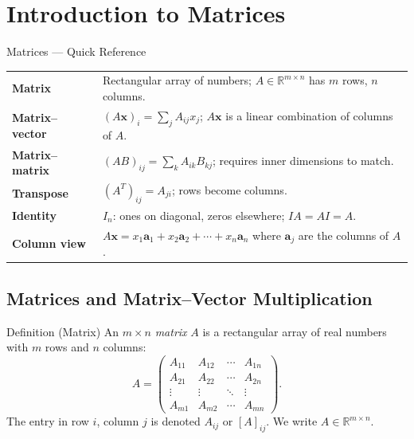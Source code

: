
\section{Introduction to Matrices}

\begin{toolkitbox}{Matrices --- Quick Reference}
\begin{tabular}{@{}p{}p{}@{}}
\textbf{Matrix}            & Rectangular array of numbers; $A \in \mathbb{R}^{m \times n}$ has $m$ rows, $n$ columns. \\[4pt]
\textbf{Matrix--vector}    & $(A\mathbf{x})_i = \sum_j A_{ij} x_j$; $A\mathbf{x}$ is a linear combination of columns of $A$. \\[4pt]
\textbf{Matrix--matrix}    & $(AB)_{ij} = \sum_k A_{ik} B_{kj}$; requires inner dimensions to match. \\[4pt]
\textbf{Transpose}         & $(A^T)_{ij} = A_{ji}$; rows become columns. \\[4pt]
\textbf{Identity}          & $I_n$: ones on diagonal, zeros elsewhere; $IA = AI = A$. \\[4pt]
\textbf{Column view}       & $A\mathbf{x} = x_1\mathbf{a}_1 + x_2\mathbf{a}_2 + \cdots + x_n\mathbf{a}_n$ where $\mathbf{a}_j$ are the columns of $A$. \\
\end{tabular}
\end{toolkitbox}

\subsection*{Matrices and Matrix--Vector Multiplication}

\begin{propositionbox}{Definition (Matrix)}
An $m \times n$ \emph{matrix} $A$ is a rectangular array of real numbers with
$m$ rows and $n$ columns:
\[
  A = \begin{pmatrix}
    A_{11} & A_{12} & \cdots & A_{1n} \\
    A_{21} & A_{22} & \cdots & A_{2n} \\
    \vdots & \vdots & \ddots & \vdots \\
    A_{m1} & A_{m2} & \cdots & A_{mn}
  \end{pmatrix}.
\]
The entry in row $i$, column $j$ is denoted $A_{ij}$ or $[A]_{ij}$.
We write $A \in \mathbb{R}^{m \times n}$.
\end{propositionbox}

